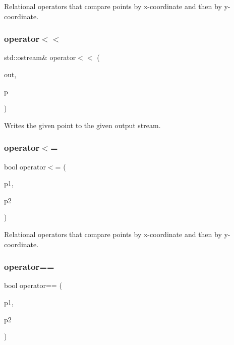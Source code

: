 Relational operators that compare points by x-\/coordinate and then by y-\/coordinate. 

\mbox{\label{classGPoint_aa8890c3cbec1c39bac51117875950b01}} 
\subsubsection{\texorpdfstring{operator$<$$<$}{operator<<}}
{\footnotesize\ttfamily std\+::ostream\& operator$<$$<$ (\begin{DoxyParamCaption}\item[{std\+::ostream \&}]{out,  }\item[{const \mbox{\hyperlink{classGPoint}{G\+Point}} \&}]{p }\end{DoxyParamCaption})\hspace{0.3cm}{\ttfamily [friend]}}



Writes the given point to the given output stream. 

\mbox{\label{classGPoint_a5b9606369659c394b2494828cb199b91}} 
\subsubsection{\texorpdfstring{operator$<$=}{operator<=}}
{\footnotesize\ttfamily bool operator$<$= (\begin{DoxyParamCaption}\item[{const \mbox{\hyperlink{classGPoint}{G\+Point}} \&}]{p1,  }\item[{const \mbox{\hyperlink{classGPoint}{G\+Point}} \&}]{p2 }\end{DoxyParamCaption})\hspace{0.3cm}{\ttfamily [friend]}}



Relational operators that compare points by x-\/coordinate and then by y-\/coordinate. 

\mbox{\label{classGPoint_a128ff5199debc26d8f040bbd46f40a67}} 
\subsubsection{\texorpdfstring{operator==}{operator==}}
{\footnotesize\ttfamily bool operator== (\begin{DoxyParamCaption}\item[{const \mbox{\hyperlink{classGPoint}{G\+Point}} \&}]{p1,  }\item[{const \mbox{\hyperlink{classGPoint}{G\+Point}} \&}]{p2 }\end{DoxyParamCaption})\hspace{0.3cm}{\ttfamily [friend]}}



